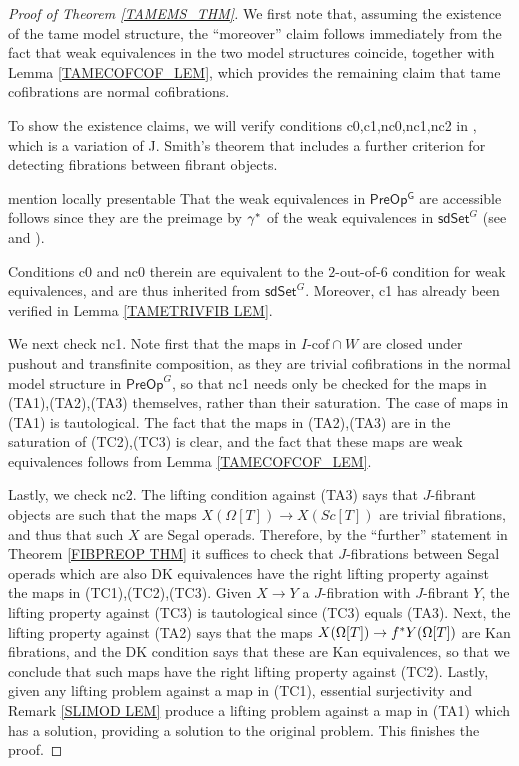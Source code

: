 \documentclass[a4paper,10pt
,draft
]{article}%
\numberwithin{equation}{section}
\numberwithin{figure}{section}
\theoremstyle{definition} %
\newcommand{\1}{\ensuremath{\mathbbm 1}}%
\begin{document}
\begin{proof}[Proof of Theorem \ref{TAMEMS_THM}]
	We first note that, assuming the existence of the tame model structure,
	the ``moreover'' claim
	follows immediately from the fact that weak equivalences in the two model structures coincide, together with  
	Lemma \ref{TAMECOFCOF_LEM},
	which provides the remaining claim that tame cofibrations are normal cofibrations.
	
	To show the existence claims, we will verify conditions c0,c1,nc0,nc1,nc2 in  
	\cite[Prop. 1.3]{Sta14},
	which is a variation of 
	J. Smith's theorem \cite[Thm. 1.7]{Bek00}
	that includes a further criterion for detecting 
	fibrations between fibrant objects.

	{\color{blue} mention locally presentable}
	That the weak equivalences in $\mathsf{PreOp^G}$ are accessible follows since they are the preimage by $\gamma^{\**}$ of the weak equivalences in 
	$\mathsf{sdSet}^G$ 
	(see \cite[Cor. A.2.6.5]{Lur09} and \cite[Cor. A.2.6.6]{Lur09}).

	
	Conditions c0 and nc0 therein are equivalent to the $2$-out-of-$6$
	condition for weak equivalences, and are thus inherited 
	from $\mathsf{sdSet}^G$.
	Moreover, c1 has already been verified in Lemma \ref{TAMETRIVFIB LEM}. 

We next check nc1. 
Note first that the maps in $I\text{-cof} \cap W$
are closed under pushout and transfinite composition, as they are trivial cofibrations in the normal model structure in 
$\mathsf{PreOp}^G$,
so that nc1 needs only be checked for the maps in (TA1),(TA2),(TA3) themselves, rather than their saturation.
The case of maps in (TA1) is tautological.
The fact that the maps in 
(TA2),(TA3) are in the saturation of (TC2),(TC3) is clear, and the fact that these maps are weak equivalences follows from 
Lemma \ref{TAMECOFCOF_LEM}.

	
Lastly, we check nc2.
The lifting condition against (TA3) says that $J$-fibrant objects are such that the maps $X(\Omega[T]) \to X(Sc[T])$
are trivial fibrations, and thus that such $X$ are Segal operads.
Therefore, by the ``further'' statement in
Theorem \ref{FIBPREOP THM} 
it suffices to check that $J$-fibrations between Segal operads which are also DK equivalences have the right lifting property against the maps in (TC1),(TC2),(TC3).
Given $X \to Y$ a $J$-fibration with $J$-fibrant $Y$,
the lifting property against (TC3) is tautological since 
(TC3) equals (TA3).
Next, the lifting property against (TA2) says that the maps
$X(\Omega[T]) \to f^{\**} Y(\Omega[T])$
are Kan fibrations, and the DK condition says that these are Kan equivalences,
so that we conclude that such maps have the right lifting property against (TC2).
Lastly, given any lifting problem against a map in (TC1),
essential surjectivity and Remark \ref{SLIMOD LEM}
produce a lifting problem against a map in (TA1) which has a solution, providing a solution to the original problem.
%
This finishes the proof.	
\end{proof}
\end{document}
